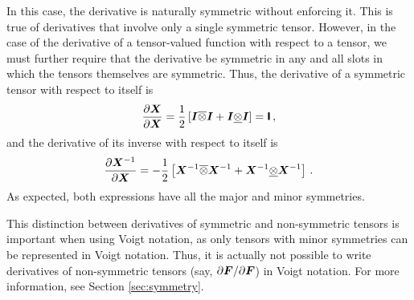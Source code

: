 \documentclass[10pt,letterpaper,oneside]{report}
\newcommand{\ten}[1]{\mbox{\boldmath $#1$}{}}
\newcommand{\tenf}[1]{\mbox{{\sffamily{\bfseries {#1}}}}}
\begin{document}
\begin{itemize}
In this case, the derivative is naturally symmetric without enforcing it.  This is true of derivatives that involve only a single symmetric tensor.  However, in the case of the derivative of a tensor-valued function with respect to a tensor, we must further require that the derivative be symmetric in any and all slots in which the tensors themselves are symmetric.  Thus, the derivative of a symmetric tensor with respect to itself is
\begin{equation}
\frac{\partial \ten{X}}{\partial \ten{X}} = \frac{1}{2} \left[ \ten{I} \overline{\otimes} \ten{I} + \ten{I} \underline{\otimes} \ten{I} \right] = \tenf{I} \, , 
\end{equation}
and the derivative of its inverse with respect to itself is
\begin{equation}
\frac{\partial \ten{X}^{-1}}{\partial \ten{X}} = - \frac{1}{2} \left[ \ten{X}^{-1} \overline{\otimes} \ten{X}^{-1} + \ten{X}^{-1} \underline{\otimes} \ten{X}^{-1} \right] \, .
\end{equation}
As expected, both expressions have all the major and minor symmetries.  

This distinction between derivatives of symmetric and non-symmetric tensors is important when using Voigt notation, as only tensors with minor symmetries can be represented in Voigt notation.  Thus, it is actually not possible to write derivatives of non-symmetric tensors (say, $\partial \ten{F} / \partial \ten{F}$) in Voigt notation.  For more information, see Section \ref{sec:symmetry}.


\end{itemize}
\end{document}
